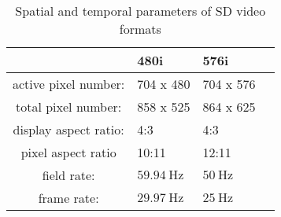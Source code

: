 \begin{table}[h!]
\caption{Spatial and temporal parameters of SD video formats}
\renewcommand*{\arraystretch}{2}
\label{tab:SD_formats}
\begin{center}
    \begin{tabular}[h!]{ @{}c | | l | l | l @{} }%
				         &   480i	   &    576i \\ \hline
    active pixel number: &  704 x 480  &   704 x 576   \\
    total pixel number:  &  858 x 525  &  864 x 625 \\
    display aspect ratio:&  4:3 &  4:3 \\
    pixel aspect ratio   &  10:11  & 12:11  \\
    field rate:          &  $59.94~\mathrm{Hz}$ &   $50~\mathrm{Hz}$ \\
    frame rate:          &   $29.97~\mathrm{Hz}$ &  $25~\mathrm{Hz}$ \\
    \end{tabular}
\end{center}
\end{table}

